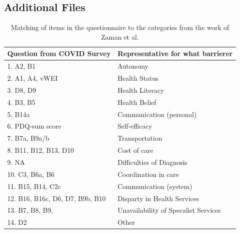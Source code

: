 \documentclass{bmcart}
\begin{document}
\begin{backmatter}
		
\section*{Additional Files}
\begin{table}[!ht]
    \centering
    \begin{tabular}{l l}
    \toprule
        \textbf{Question from COVID Survey}	& \textbf{Representative for what barrierer} \\
	\midrule
        1. A2, B1 							& Autonomy \\ \hline
        2. A1, A4, vWEI 					& Health Status \\ \hline
        3. D8, D9 							& Health Literacy \\ \hline
        4. B3, B5 							& Health Belief \\ \hline
        5. B14a 							& Communication (personal) \\ \hline
        6. PDQ-sum score 					& Self-efficacy \\ \hline
        7. B7a, B9a/b 						& Transportation \\ \hline
        8. B11, B12, B13, D10 				& Cost of care \\ \hline
        9. NA 							& Difficulties of Diagnosis \\ \hline
        10. C3, B6a, B6 					& Coordination in care \\ \hline
        11. B15, B14, C2c 					& Communication (system) \\ \hline
        12. B16, B16c, D6, D7, B9b, B10 		& Disparty in Health Services \\ \hline
        13. B7, B8, B9, 						& Unavailability of Specalist Services \\ \hline
        14. D2 							& Other \\
        \bottomrule
    \end{tabular}
\caption{Matching of items in the questionnaire to the categories from the work of Zaman et al. \cite{zaman2021barriers}}
\end{table}


\end{backmatter}
\end{document}
